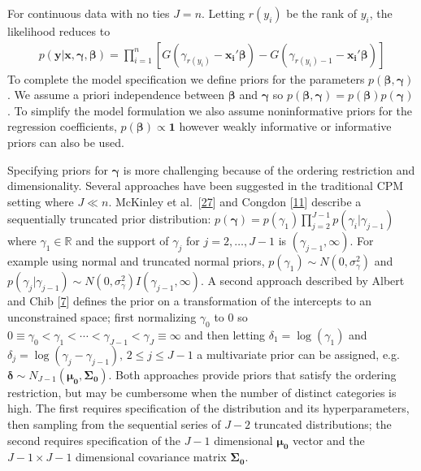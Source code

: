 \documentclass[
]{article}
\begin{document}
For continuous data with no ties \(J=n\). Letting \(r(y_i)\) be the rank of \(y_i\), the likelihood reduces to
\begin{gather}
p(\boldsymbol{y}|\boldsymbol{x},\boldsymbol{\gamma},\boldsymbol{\beta})=
\prod_{i=1}^{n}[G(\gamma_{r(y_i)}-\boldsymbol{x_i'\beta})-G(\gamma_{r(y_i)-1}-\boldsymbol{x_i'\beta})]
\end{gather}
To complete the model specification we define priors for the parameters \(p(\boldsymbol{\beta},\boldsymbol{\gamma})\). We assume a priori independence between \(\boldsymbol{\beta}\) and \(\boldsymbol{\gamma}\) so \(p(\boldsymbol{\beta},\boldsymbol{\gamma})=p(\boldsymbol{\beta})p(\boldsymbol{\gamma})\). To simplify the model formulation we also assume noninformative priors for the regression coefficients, \(p(\boldsymbol{\beta}) \propto \boldsymbol{1}\) however weakly informative or informative priors can also be used.

Specifying priors for \(\boldsymbol{\gamma}\) is more challenging because of the ordering restriction and dimensionality. Several approaches have been suggested in the traditional CPM setting where \(J \ll n\). McKinley et al.~{{[}\protect\hyperlink{ref-mckinley_bayesian_2015}{27}{]}} and Congdon {{[}\protect\hyperlink{ref-congdon_bayesian_2005}{11}{]}} describe a sequentially truncated prior distribution: \(p(\boldsymbol{\gamma})=p(\gamma_1)\prod_{j=2}^{J-1}p(\gamma_i|\gamma_{j-1})\) where \(\gamma_1 \in \mathbb{R}\) and the support of \(\gamma_j\) for \(j=2,\ldots, J-1\) is \((\gamma_{j-1},\infty)\). For example using normal and truncated normal priors, \(p(\gamma_1)\sim N(0, \sigma_\gamma^2)\) and \(p(\gamma_j|\gamma_{j-1}) \sim N(0, \sigma_\gamma^2)I(\gamma_{j-1},\infty)\). A second approach described by Albert and Chib {{[}\protect\hyperlink{ref-albert_bayesian_1997}{7}{]}} defines the prior on a transformation of the intercepts to an unconstrained space; first normalizing \(\gamma_0\) to 0 so \(0 \equiv \gamma_0 < \gamma_1 < \cdots < \gamma_{J-1} <\gamma_J \equiv \infty\) and then letting \(\delta_1=\log(\gamma_1)\) and \(\delta_j=\log(\gamma_j - \gamma_{j-1}),\, 2 \le j \le J-1\) a multivariate prior can be assigned, e.g.~\(\boldsymbol{\delta} \sim N_{J-1}(\boldsymbol{\mu_0},\boldsymbol{\Sigma_0})\).
Both approaches provide priors that satisfy the ordering restriction, but may be cumbersome when the number of distinct categories is high. The first requires specification of the distribution and its hyperparameters, then sampling from the sequential series of \(J-2\) truncated distributions; the second requires specification of the \(J-1\) dimensional \(\boldsymbol{\mu_0}\) vector and the \(J-1 \times J-1\) dimensional covariance matrix \(\boldsymbol{\Sigma_0}\).
\end{document}
